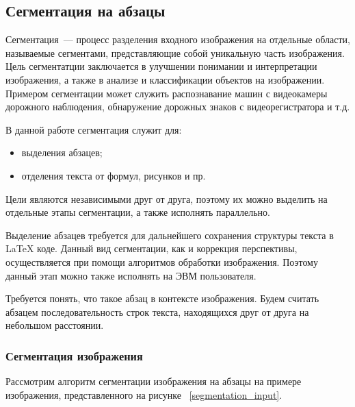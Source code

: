 \subsection{Сегментация на абзацы}

Сегментация~--- процесс разделения входного изображения на отдельные области, называемые сегментами, представляющие собой уникальную часть изображения. Цель сегментатции заключается в улучшении понимании и интерпретации изображения, а также в анализе и классификации объектов на изображении.
Примером сегментации может служить распознавание машин с видеокамеры дорожного наблюдения, обнаружение дорожных знаков с видеорегистратора и т.д.

В данной работе сегментация служит для:
\begin{itemize}
    \item выделения абзацев;
    \item отделения текста от формул, рисунков и пр.
\end{itemize}

Цели являются независимыми друг от друга, поэтому их можно выделить на отдельные этапы сегментации, а также исполнять параллельно. 

Выделение абзацев требуется для дальнейшего сохранения структуры текста в \LaTeX\; коде. Данный вид сегментации, как и коррекция перспективы, осуществляется при помощи алгоритмов обработки изображения.
Поэтому данный этап можно также исполнять на ЭВМ пользователя.

Требуется понять, что такое абзац в контексте изображения. Будем считать абзацем последовательность строк текста, находящихся друг от друга на небольшом расстоянии.

\subsubsection{Сегментация изображения}

Рассмотрим алгоритм сегментации изображения на абзацы на примере изображения, представленного на рисунке ~\ref{segmentation_input}.

